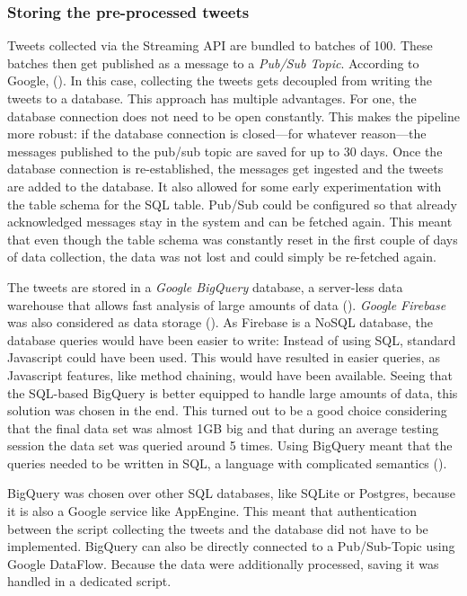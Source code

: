 \subsubsection{Storing the pre-processed tweets}
Tweets collected via the Streaming API are bundled to batches of 100. These batches then get published as a message to a \emph{Pub/Sub Topic}. According to Google,  (\cite{googleWhatPubSub2020}). In this case, collecting the tweets gets decoupled from writing the tweets to a database. This approach has multiple advantages. For one, the database connection does not need to be open constantly. This makes the pipeline more robust: if the database connection is closed---for whatever reason---the messages published to the pub/sub topic are saved for up to 30 days. Once the database connection is re-established, the messages get ingested and the tweets are added to the database. It also allowed for some early experimentation with the table schema for the SQL table. Pub/Sub could be configured so that already acknowledged messages stay in the system and can be fetched again. This meant that even though the table schema was constantly reset in the first couple of days of data collection, the data was not lost and could simply be re-fetched again.

The tweets are stored in a \emph{Google BigQuery} database, a server-less data warehouse that allows fast analysis of large amounts of data (\cite{googleBigQueryCloudData2020}). \emph{Google Firebase} was also considered as data storage (\cite{googleCloudFirestoreFirebase2020}). As Firebase is a NoSQL database, the database queries would have been easier to write: Instead of using SQL, standard Javascript could have been used. This would have resulted in easier queries, as Javascript features, like method chaining, would have been available. Seeing that the SQL-based BigQuery is better equipped to handle large amounts of data, this solution was chosen in the end. This turned out to be a good choice considering that the final data set was almost 1GB big and that during an average testing session the data set was queried around 5 times. Using BigQuery meant that the queries needed to be written in SQL, a language with complicated semantics (\cite{slutz1998massive}).

BigQuery was chosen over other SQL databases, like SQLite or Postgres, because it is also a Google service like AppEngine. This meant that authentication between the script collecting the tweets and the database did not have to be implemented. BigQuery can also be directly connected to a Pub/Sub-Topic using Google DataFlow. Because the data were additionally processed, saving it was handled in a dedicated script. 

